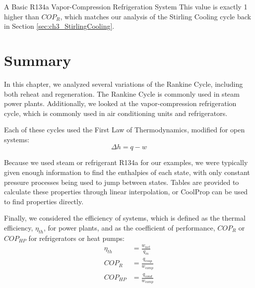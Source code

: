 \begin{example}[label=ex:ch4_refrigeration]{A Basic R134a Vapor-Compression Refrigeration System}
  This value is exactly 1 higher than $COP_R$, which matches our analysis of the Stirling Cooling cycle back in Section \ref{sec:ch3_StirlingCooling}.
  
\end{example}

\section{Summary}
In this chapter, we analyzed several variations of the Rankine Cycle, including both reheat and regeneration.  The Rankine Cycle is commonly used in steam power plants.  Additionally, we looked at the vapor-compression refrigeration cycle, which is commonly used in air conditioning units and refrigerators.

Each of these cycles used the First Law of Thermodynamics, modified for open systems:
\begin{equation*}
  \Delta h = q-w
\end{equation*}

Because we used steam or refrigerant R134a for our examples, we were typically given enough information to find the enthalpies of each state, with only constant pressure processes being used to jump between states.  Tables are provided to calculate these properties through linear interpolation, or CoolProp can be used to find properties directly.

Finally, we considered the efficiency of systems, which is defined as the thermal efficiency, $\eta_{th}$, for power plants, and as the coefficient of performance, $COP_R$ or $COP_{HP}$ for refrigerators or heat pumps:
\begin{align*}
  \eta_{th} &= \frac{w_{net}}{q_{in}} \\
  COP_R &= \frac{q_{evap}}{w_{comp}} \\
  COP_{HP} &= \frac{q_{cond}}{w_{comp}}
\end{align*}


